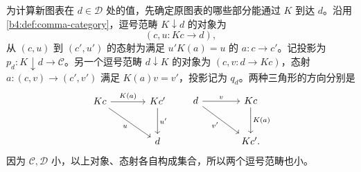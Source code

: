 为计算新图表在 \(d\in\mathcal D\) 处的值，先确定原图表的哪些部分能通过 \(K\) 到达 \(d\)。沿用\cref{b4:def:comma-category}，逗号范畴 \(K\downarrow d\) 的对象为
\[
	(c,u:Kc\longrightarrow d),
\]
从 \((c,u)\) 到 \((c',u')\) 的态射为满足 \(u'K(a)=u\) 的 \(a:c\rightarrow c'\)。记投影为 \(p_d:K\downarrow d\rightarrow\mathcal C\)。另一个逗号范畴 \(d\downarrow K\) 的对象为 \((c,v:d\rightarrow Kc)\)，态射 \(a:(c,v)\rightarrow(c',v')\) 满足 \(K(a)v=v'\)，投影记为 \(q_d\)。两种三角形的方向分别是
\[
	\begin{tikzcd}[column sep=large,row sep=large]
		Kc\arrow[r,"K(a)"]\arrow[dr,"u"']&Kc'\arrow[d,"u'"]\\
		&d
	\end{tikzcd}
	\qquad
	\begin{tikzcd}[column sep=large,row sep=large]
		d\arrow[r,"v"]\arrow[dr,"v'"']&Kc\arrow[d,"K(a)"]\\
		&Kc'.
	\end{tikzcd}
\]
因为 \(\mathcal C,\mathcal D\) 小，以上对象、态射各自构成集合，所以两个逗号范畴也小。

